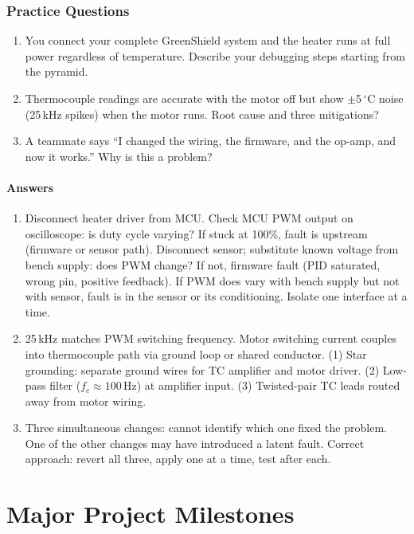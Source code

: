 \documentclass[11pt,letterpaper,twoside,openany]{book}
\newcommand{\degC}{\ensuremath{{}^{\circ}\text{C}}}
\begin{document}
\section{Practice Questions}
\begin{enumerate}[leftmargin=1.5em]
\item You connect your complete GreenShield system and the heater runs at full power regardless of temperature. Describe your debugging steps starting from the pyramid.
\item Thermocouple readings are accurate with the motor off but show $\pm$5\,\degC{} noise (25\,kHz spikes) when the motor runs. Root cause and three mitigations?
\item A teammate says ``I changed the wiring, the firmware, and the op-amp, and now it works.'' Why is this a problem?
\end{enumerate}

\subsection{Answers}
\begin{enumerate}[leftmargin=1.5em]
\item Disconnect heater driver from MCU. Check MCU PWM output on oscilloscope: is duty cycle varying? If stuck at 100\%, fault is upstream (firmware or sensor path). Disconnect sensor; substitute known voltage from bench supply: does PWM change? If not, firmware fault (PID saturated, wrong pin, positive feedback). If PWM does vary with bench supply but not with sensor, fault is in the sensor or its conditioning. Isolate one interface at a time.
\item 25\,kHz matches PWM switching frequency. Motor switching current couples into thermocouple path via ground loop or shared conductor. (1) Star grounding: separate ground wires for TC amplifier and motor driver. (2) Low-pass filter ($f_c \approx 100$\,Hz) at amplifier input. (3) Twisted-pair TC leads routed away from motor wiring.
\item Three simultaneous changes: cannot identify which one fixed the problem. One of the other changes may have introduced a latent fault. Correct approach: revert all three, apply one at a time, test after each.
\end{enumerate}


\part{Major Project Milestones}
\end{document}
